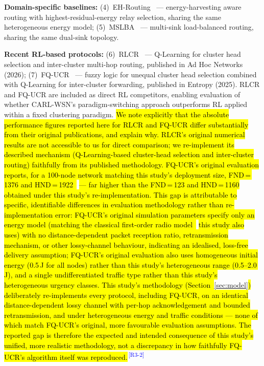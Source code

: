 \documentclass[12pt]{article}
\newcommand{\rtag}[1]{\textsuperscript{\textcolor{blue}{\scriptsize\,[#1]}}}
\newcommand{\hlx}[1]{{\exhyphenpenalty=10000\hyphenpenalty=10000\let\ \nobreakspace\hl{#1}}}
\begin{document}
\textbf{Domain-specific baselines:}
(4)~EH-Routing~\cite{salman2021} --- energy-harvesting aware routing
with highest-residual-energy relay selection, sharing the same
heterogeneous energy model;
(5)~MSLBA~\cite{salman2023} --- multi-sink load-balanced routing,
sharing the same dual-sink topology.

\textbf{Recent RL-based protocols:}
(6)~RLCR~\cite{daanoune_intelligent_2026} --- Q-Learning for cluster
head selection and inter-cluster multi-hop routing, published in
Ad Hoc Networks (2026);
(7)~FQ-UCR~\cite{wang_fqucr_2025} --- fuzzy logic for unequal cluster
head selection combined with Q-Learning for inter-cluster forwarding,
published in Entropy (2025).
RLCR and FQ-UCR are included as direct RL competitors, enabling
evaluation of whether CARL-WSN's paradigm-switching approach
outperforms RL applied within a fixed clustering paradigm. \hlx{We note
explicitly that the absolute performance figures reported here for
RLCR and FQ-UCR differ substantially from their original
publications, and explain why. RLCR's original numerical results are
not accessible to us for direct comparison; we re-implement its
described mechanism (Q-Learning-based cluster-head selection and
inter-cluster routing) faithfully from its published methodology.
FQ-UCR's original evaluation reports, for a 100-node network
matching this study's deployment size, FND\,=\,1376 and
HND\,=\,1922~}\cite{wang_fqucr_2025}\hlx{ --- far higher than the
FND\,=\,123 and HND\,=\,1160 obtained under this study's
re-implementation. This gap is attributable to specific, identifiable
differences in evaluation methodology rather than re-implementation
error: FQ-UCR's original simulation parameters specify only an
energy model (matching the classical first-order radio
model~}\cite{heinzelman2000}\hlx{ this study also uses) with no
distance-dependent packet reception ratio, retransmission mechanism,
or other lossy-channel behaviour, indicating an idealised,
loss-free delivery assumption; FQ-UCR's original evaluation also uses
homogeneous initial energy (0.5\,J for all nodes) rather than this
study's heterogeneous range (0.5--2.0\,J), and a single undifferentiated
traffic type rather than this study's heterogeneous urgency classes.
This study's methodology (Section~}\ref{sec:model}\hlx{) deliberately
re-implements every protocol, including FQ-UCR, on an identical
distance-dependent lossy channel with per-hop acknowledgement and
bounded retransmission, and under heterogeneous energy and traffic
conditions --- none of which match FQ-UCR's original, more favourable
evaluation assumptions. The reported gap is therefore the expected
and intended consequence of this study's unified, more realistic
methodology, not a discrepancy in how faithfully FQ-UCR's algorithm
itself was reproduced.}\rtag{R3-2}
\end{document}
